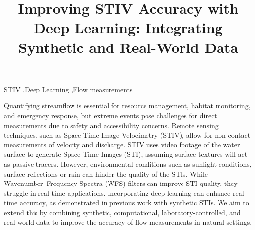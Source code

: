 \documentclass[preprint,12pt]{elsarticle}
\begin{document}
\begin{frontmatter}

\title{Improving STIV Accuracy with Deep Learning: Integrating Synthetic and Real-World Data}

\begin{keyword}
STIV \sep Deep Learning \sep Flow measurements
\end{keyword}

\end{frontmatter}

\linenumbers

Quantifying streamflow is essential for resource management, habitat monitoring, and emergency response, but extreme events pose challenges for direct measurements due to safety and accessibility concerns. Remote sensing techniques, such as Space-Time Image Velocimetry (STIV), allow for non-contact measurements of velocity and discharge. STIV uses video footage of the water surface to generate Space-Time Images (STI), assuming surface textures will act as passive tracers. However, environmental conditions such as sunlight conditions, surface reflections or rain can hinder the quality of the STIs. While Wavenumber–Frequency Spectra (WFS) filters can improve STI quality, they struggle in real-time applications. Incorporating deep learning can enhance real-time accuracy, as demonstrated in previous work with synthetic STIs. We aim to extend this by combining synthetic, computational, laboratory-controlled, and real-world data to improve the accuracy of flow measurements in natural settings.
\end{document}
